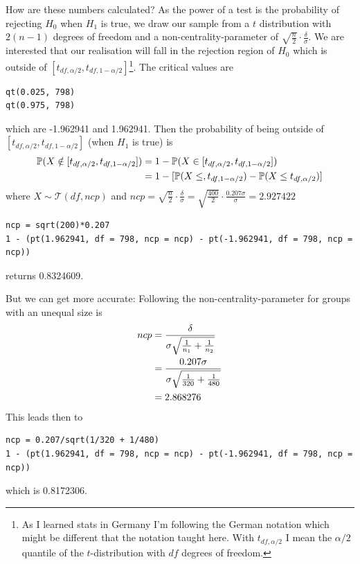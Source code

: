 \documentclass{article}
\begin{document}
	How are these numbers calculated? As the power of a test is the probability of rejecting $H_0$ when $H_1$ is true, we draw our sample from a $t$ distribution with $2(n-1)$ degrees of freedom and a non-centrality-parameter of $\sqrt{\frac{n}{2}}\cdot\frac{\delta}{\sigma}$. We are interested that our realisation will fall in the rejection region of $H_0$ which is outside of $[t_{df,\alpha/2},t_{df,1-\alpha/2}]$\footnote{As I learned stats in Germany I'm following the German notation which might be different that the notation taught here. With $t_{df,\alpha/2}$ I mean the $\alpha/2$ quantile of the $t$-distribution with $df$ degrees of freedom.}. The critical values are
	\begin{lstlisting}
qt(0.025, 798)
qt(0.975, 798)
	\end{lstlisting}
	which are -1.962941 and 1.962941. Then the probability of being outside of $[t_{df,\alpha/2},t_{df,1-\alpha/2}]$ (when $H_1$ is true) is
	\begin{align}
		\mathbb{P}(X\notin [t_{df,\alpha/2},t_{df,1-\alpha/2}]) &= 1 - \mathbb{P}(X\in [t_{df,\alpha/2},t_{df,1-\alpha/2}]) \notag \\
		&= 1 - [\mathbb{P}(X\le ,t_{df,1-\alpha/2}) - \mathbb{P}(X \le t_{df,\alpha/2})] \notag
	\end{align}
	where $X\sim \mathcal{T}(df, ncp)$ and $ncp = \sqrt{\frac{n}{2}}\cdot\frac{\delta}{\sigma} = \sqrt{\frac{400}{2}}\cdot\frac{0.207\sigma}{\sigma} = 2.927422$
	\begin{lstlisting}
ncp = sqrt(200)*0.207
1 - (pt(1.962941, df = 798, ncp = ncp) - pt(-1.962941, df = 798, ncp = ncp))
	\end{lstlisting}
	returns 0.8324609.
	
	But we can get more accurate: Following \cite{Dalgaard2008} the non-centrality-parameter for groups with an unequal size is
	\begin{align}
		ncp &= \frac{\delta}{\sigma\sqrt{\frac{1}{n_1} + \frac{1}{n_2}}} \notag \\
		&= \frac{0.207\sigma}{\sigma\sqrt{\frac{1}{320} + \frac{1}{480}}} \notag \\
		&= 2.868276 \notag
	\end{align}
	This leads then to
	\begin{lstlisting}
ncp = 0.207/sqrt(1/320 + 1/480)
1 - (pt(1.962941, df = 798, ncp = ncp) - pt(-1.962941, df = 798, ncp = ncp))
\end{lstlisting}	
	which is 0.8172306.
\end{document}
